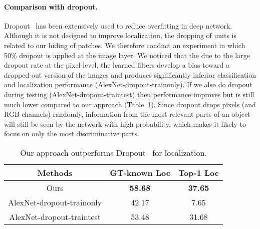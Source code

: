 \paragraph{Comparison with dropout.}  Dropout~\cite{srivastava-jmlr2014} has been extensively used to reduce overfitting in deep network.  Although it is not designed to improve localization, the dropping of units is related to our hiding of patches. We therefore conduct an experiment in which 50\% dropout is applied at the image layer. We noticed that the due to the large dropout rate at the pixel-level, the learned filters develop a bias toward a dropped-out version of the images and produces significantly inferior classification and localization performance (AlexNet-dropout-trainonly). If we also do dropout during testing (AlexNet-dropout-traintest) then performance improves but is still much lower compared to our approach (Table~\ref{table:dropout_results}).   Since dropout drops pixels (and RGB channels) randomly, information from the most relevant parts of an object will still be seen by the network with high probability, which makes it likely to focus on only the most discriminative parts.




\begin{table}[t!]
            \begin{center}
                \footnotesize
                \begin{tabular}{| c | c | c|}
                \hline    	
                Methods & GT-known Loc &  Top-1 Loc \\
                \hline

                Ours      &     \textbf{58.68} & \textbf{37.65}  \\
                AlexNet-dropout-trainonly            & 42.17 & 7.65  \\
                AlexNet-dropout-traintest           &  53.48  & 31.68  \\

                \hline
                 \end{tabular}
                        \caption{Our approach outperforms Dropout~\cite{srivastava-jmlr2014} for localization.}
                        \label{table:dropout_results}
                        \end{center}
                        \vspace*{-0.15in}
                        \end{table}






